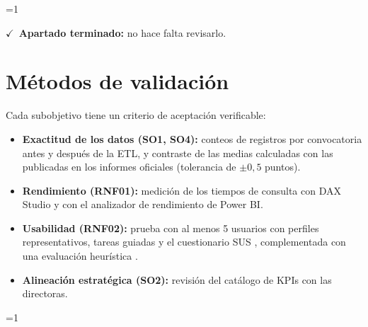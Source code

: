 \documentclass[12pt, a4paper, oneside]{report}
\newcommand{\mostrarterminados}{1}
\newenvironment{revisado}
  {\ifnum\mostrarterminados=1\relax\begin{cajarevisada}\noindent\colorbox{verdeterminado}{\parbox{\dimexpr\linewidth-2\fboxsep\relax}{\small$\checkmark$\ \textbf{Apartado terminado:} no hace falta revisarlo.}}\par\medskip\fi}
  {\ifnum\mostrarterminados=1\relax\end{cajarevisada}\fi}
\begin{document}
\begin{revisado}
\section{Métodos de validación}
\label{sec:validacion}
Cada subobjetivo tiene un criterio de aceptación verificable:
\begin{itemize}
    \item \textbf{Exactitud de los datos (SO1, SO4):} conteos de registros por convocatoria antes y después de la ETL, y contraste de las medias calculadas con las publicadas en los informes oficiales \cite{csase_resultats} (tolerancia de $\pm 0{,}5$ puntos).
    \item \textbf{Rendimiento (RNF01):} medición de los tiempos de consulta con DAX Studio \cite{dax_studio} y con el analizador de rendimiento de Power BI.
    \item \textbf{Usabilidad (RNF02):} prueba con al menos 5 usuarios con perfiles representativos, tareas guiadas y el cuestionario SUS \cite{brooke1996sus}, complementada con una evaluación heurística \cite{nielsen1993usability}.
    \item \textbf{Alineación estratégica (SO2):} revisión del catálogo de KPIs con las directoras.
\end{itemize}
\end{revisado}

\end{document}
